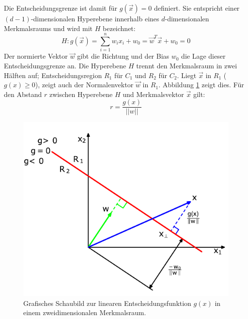 Die Entscheidungsgrenze ist damit für $g(\vec{x}) = 0$ definiert. Sie entspricht einer $(d-1)$-dimensionalen Hyperebene innerhalb eines $d$-dimensionalen Merkmalsraums und wird mit $H$ bezeichnet:
\[
	H: g(\vec{x}) = \sum_{i=1}^{n} w_i x_i + w_0 = \vec{w}^T \vec{x} + w_0 = 0
\]
Der normierte Vektor $\vec{w}$ gibt die Richtung und der Bias $w_0$ die Lage dieser Entscheidungsgrenze an. Die Hyperebene $H$ trennt den Merkmalsraum in zwei Hälften auf; Entscheidungsregion $R_1$ für $C_1$ und $R_2$ für $C_2$. Liegt $\vec{x}$ in $R_1$ ($g(x) \ge 0$), zeigt auch der Normalenvektor $\vec{w}$ in $R_1$. Abbildung \ref{fig:lineare-entscheidunsfunktion} zeigt dies. Für den Abstand $r$ zwischen Hyperebene $H$ und Merkmalsvektor $\vec{x}$ gilt:
\[
	r = \frac{g(x)}{||w||}
\]

\begin{figure}[ht!] \centering 
	\includegraphics[width=\linewidth]{figures/ch02_lineare-entscheidungsfunktion.pdf}
	\caption{Grafisches Schaubild zur linearen Entscheidungsfunktion $g(x)$ in einem zweidimensionalen Merkmalsraum.}
	\label{fig:lineare-entscheidunsfunktion}
\end{figure}


